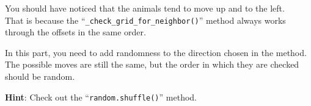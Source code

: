 You should have noticed that the animals tend to move up and to the left.\\
That is because the ``\texttt{\_check\_grid\_for\_neighbor()}'' method always works through the offsets in the same order.

In this part, you need to add randomness to the direction chosen in the method.
The possible moves are still the same, but the order in which they are checked should be random.

\textbf{Hint}: Check out the ``\texttt{random.shuffle()}'' method.
